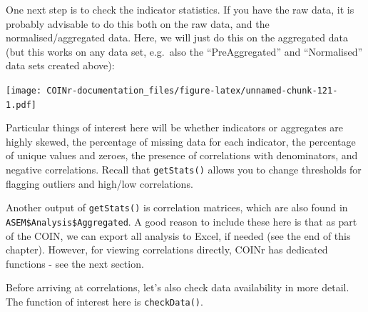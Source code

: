 \documentclass[
]{book}
\newenvironment{Shaded}{\begin{snugshade}}{\end{snugshade}}
\newcommand{\AttributeTok}[1]{\textcolor[rgb]{0.77,0.63,0.00}{#1}}
\newcommand{\CommentTok}[1]{\textcolor[rgb]{0.56,0.35,0.01}{\textit{#1}}}
\newcommand{\DocumentationTok}[1]{\textcolor[rgb]{0.56,0.35,0.01}{\textbf{\textit{#1}}}}
\newcommand{\FunctionTok}[1]{\textcolor[rgb]{0.00,0.00,0.00}{#1}}
\newcommand{\NormalTok}[1]{#1}
\newcommand{\OtherTok}[1]{\textcolor[rgb]{0.56,0.35,0.01}{#1}}
\newcommand{\SpecialCharTok}[1]{\textcolor[rgb]{0.00,0.00,0.00}{#1}}
\newcommand{\StringTok}[1]{\textcolor[rgb]{0.31,0.60,0.02}{#1}}
\begin{document}
One next step is to check the indicator statistics. If you have the raw data, it is probably advisable to do this both on the raw data, and the normalised/aggregated data. Here, we will just do this on the aggregated data (but this works on any data set, e.g.~also the ``PreAggregated'' and ``Normalised'' data sets created above):

\begin{Shaded}
\end{Shaded}

\texttt{[image: COINr-documentation\_files/figure-latex/unnamed-chunk-121-1.pdf]}

Particular things of interest here will be whether indicators or aggregates are highly skewed, the percentage of missing data for each indicator, the percentage of unique values and zeroes, the presence of correlations with denominators, and negative correlations. Recall that \texttt{getStats()} allows you to change thresholds for flagging outliers and high/low correlations.

Another output of \texttt{getStats()} is correlation matrices, which are also found in \texttt{ASEM\$Analysis\$Aggregated}. A good reason to include these here is that as part of the COIN, we can export all analysis to Excel, if needed (see the end of this chapter). However, for viewing correlations directly, COINr has dedicated functions - see the next section.

Before arriving at correlations, let's also check data availability in more detail. The function of interest here is \texttt{checkData()}.
\end{document}
